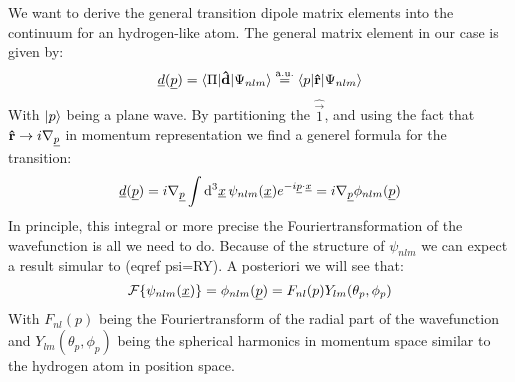 \label{sec:dipolematrixelements}
We want to derive the general transition dipole matrix elements into the continuum for an hydrogen-like atom. The general matrix element in our case is given by:
\begin{equation*}
    \underline{d}(\underline{p}) = \braket{\Pi|\mathbf{\hat{d}}|\Psi_{nlm}} \stackrel{\mathrm{a.u.}}{=} \braket{p|\mathbf{\hat{r}}|\Psi_{nlm}}
\end{equation*}
With $\ket{p}$ being a plane wave. By partitioning the $\hat{\vec{1}}$, and using the fact that $\mathbf{\hat{r}} \rightarrow i\nabla_{\underline{p}}$ %
in momentum representation we find a generel formula for the transition:
\begin{equation*}
    \underline{d}(\underline{p}) = i\nabla_{\underline{p}}\int \mathrm{d}^3\underline{x}\,\psi_{nlm}(\underline{x}) e^{-i\underline{p}\cdot\underline{x}} = i\nabla_{\underline{p}}\phi_{nlm}(\underline{p})
\end{equation*}
In principle, this integral or more precise the Fouriertransformation of the wavefunction is all we need to do.
Because of the structure of $\psi_{nlm}$ we can expect a result simular to (eqref psi=RY).
A posteriori we will see that:
\begin{equation*}
    \mathcal{F}\{\psi_{nlm}(\underline{x})\} = \phi_{nlm}(\underline{p}) = F_{nl}(p)Y_{lm}(\theta_p, \phi_p)
\end{equation*}
With $F_{nl}(p)$ being the Fouriertransform of the radial part of the wavefunction and $Y_{lm}(\theta_p, \phi_p)$ being the spherical harmonics in momentum space similar to the hydrogen atom in position space.




